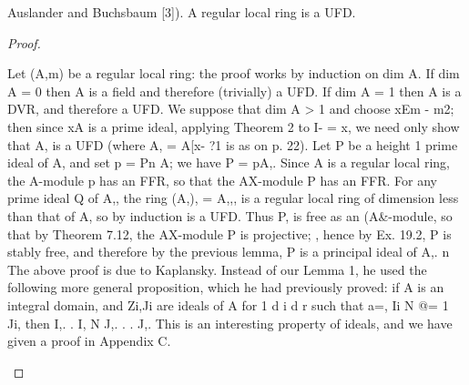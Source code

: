 \begin{theorem}[Theorem 20.3]\label{mcrt-auto-theorem-20-3}
\begin{mathematicalrecord}
Auslander and Buchsbaum [3]). A regular local ring is a
  UFD.
\end{mathematicalrecord}
\end{theorem}
\begin{proof}
\begin{mathematicalrecord}
Let (A,m) be a regular local ring: the proof works by induction
  on dim A. If dim A = 0 then A is a field and therefore (trivially) a UFD.
  If dim A = 1 then A is a DVR, and therefore a UFD. We suppose that
  dim A > 1 and choose xEm - m2; then since xA is a prime ideal, applying
  Theorem 2 to I- = {x}, we need only show that A, is a UFD (where
  A, = A[x- ?1 is as on p. 22). Let P be a height 1 prime ideal of A, and
  set p = Pn A; we have P = pA,. Since A is a regular local ring, the
  A-module p has an FFR, so that the AX-module P has an FFR. For any
  prime ideal Q of A,, the ring (A,), = A,,, is a regular local ring of
  dimension less than that of A, so by induction is a UFD. Thus P, is free
  as an (A&-module,     so that by Theorem 7.12, the AX-module P is projective;
, hence by Ex. 19.2, P is stably free, and therefore by the previous lemma,
  P is a principal ideal of A,.    n
     The above proof is due to Kaplansky. Instead of our Lemma 1, he used
  the following more general proposition, which he had previously proved:
  if A is an integral domain, and Zi,Ji are ideals of A for 1 d i d r such that
  a=, Ii N @= 1 Ji, then I,. . I, N J,. . . J,. This is an interesting property
  of ideals, and we have given a proof in Appendix C.
\end{mathematicalrecord}
\end{proof}


